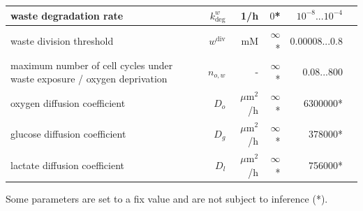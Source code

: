 \documentclass[10pt,letterpaper]{article}
\newcommand{\jh}[1]{{\color{red}#1}}
\begin{document}
\begin{table}[!ht]
\begin{adjustwidth}{-0.5in}{0in}
\begin{tabular}{|p{6cm}|r|r|r|r|r|}
waste degradation rate					& $k^w_{\text{deg}}$ &1/h &$0$*& $10^{-8}...10^{-4}$\\ \hline
waste division threshold 			&$w^{\text{div}}$ &\jh{mM} &$\infty$*&0.00008...0.8\\ \hline
maximum number of cell cycles under waste exposure / oxygen deprivation  	&$n_{o,w}$&-& $\infty$*& 0.08...800\\ \hline
\hline
oxygen diffusion coefficient		&$D_o$&  $\mu$m$^{2}$/h&  $\infty$*& 6300000* \\ \hline
glucose diffusion coefficient		&$D_g$&  $\mu$m$^{2}$/h&  $\infty$*&  378000*\\ \hline
lactate diffusion coefficient		&$D_l$&  $\mu$m$^{2}$/h&  $\infty$*&  756000*\\ \hline
\end{tabular}
Some parameters are set to a fix value and are not subject to inference (*).
\label{tab:model-parameters}
\end{adjustwidth}
\end{table}
\end{document}
